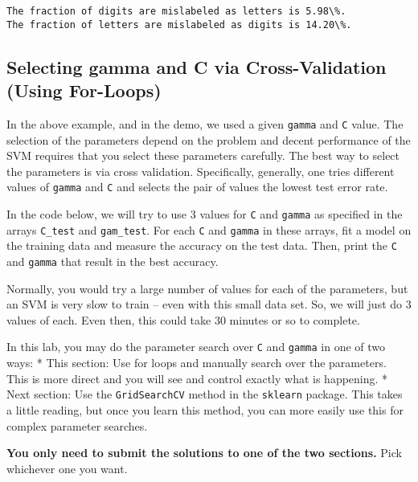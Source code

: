 \documentclass[11pt]{article}
\begin{document}
    \begin{Verbatim}[commandchars=\\\{\}]
The fraction of digits are mislabeled as letters is 5.98\%.
The fraction of letters are mislabeled as digits is 14.20\%.

    \end{Verbatim}

    \hypertarget{selecting-gamma-and-c-via-cross-validation-using-for-loops}{%
\subsection{Selecting gamma and C via Cross-Validation (Using
For-Loops)}\label{selecting-gamma-and-c-via-cross-validation-using-for-loops}}

In the above example, and in the demo, we used a given \texttt{gamma}
and \texttt{C} value. The selection of the parameters depend on the
problem and decent performance of the SVM requires that you select these
parameters carefully. The best way to select the parameters is via cross
validation. Specifically, generally, one tries different values of
\texttt{gamma} and \texttt{C} and selects the pair of values the lowest
test error rate.

In the code below, we will try to use 3 values for \texttt{C} and
\texttt{gamma} as specified in the arrays \texttt{C\_test} and
\texttt{gam\_test}. For each \texttt{C} and \texttt{gamma} in these
arrays, fit a model on the training data and measure the accuracy on the
test data. Then, print the \texttt{C} and \texttt{gamma} that result in
the best accuracy.

Normally, you would try a large number of values for each of the
parameters, but an SVM is very slow to train -- even with this small
data set. So, we will just do 3 values of each. Even then, this could
take 30 minutes or so to complete.

In this lab, you may do the parameter search over \texttt{C} and
\texttt{gamma} in one of two ways: * This section: Use for loops and
manually search over the parameters. This is more direct and you will
see and control exactly what is happening. * Next section: Use the
\texttt{GridSearchCV} method in the \texttt{sklearn} package. This takes
a little reading, but once you learn this method, you can more easily
use this for complex parameter searches.

\textbf{You only need to submit the solutions to one of the two
sections.} Pick whichever one you want.
\end{document}
